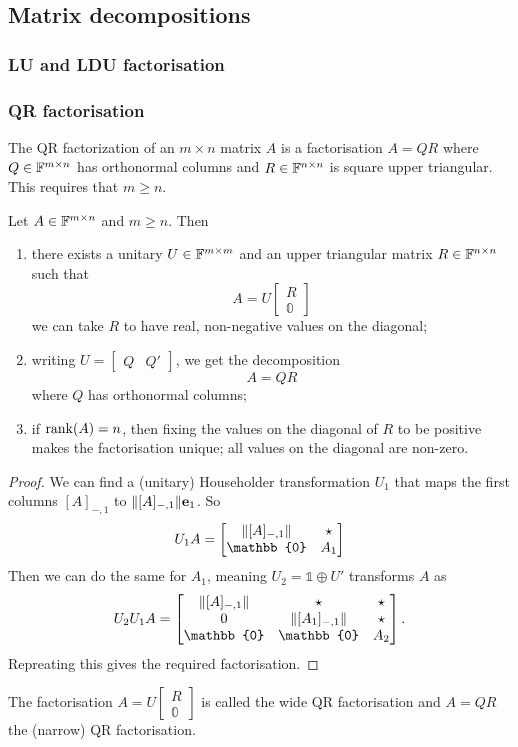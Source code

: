 \subsection{Matrix decompositions}
\subsubsection{LU and LDU factorisation}
\subsubsection{QR factorisation}
The QR factorization of an $m \times n$ matrix $A$ is a factorisation
$A=QR$
where $Q\in\mathbb{F}^{m\times n}$ has orthonormal columns and $R\in\mathbb{F}^{n\times n}$ is square upper triangular.
This requires that $m\geq n$.

\begin{proposition}[QR factorisation]
Let $A\in\mathbb{F}^{m\times n}$ and $m\geq n$. Then
\begin{enumerate}
\item there exists a unitary $U\in\mathbb{F}^{m\times m}$ and an upper triangular matrix $R\in\mathbb{F}^{n\times n}$ such that
\[ A = U \begin{bmatrix}
R \\ \mathbb{0}
\end{bmatrix} \]
we can take $R$ to have real, non-negative values on the diagonal;
\item writing $U = \begin{bmatrix}
Q & Q'
\end{bmatrix}$, we get the decomposition
\[ A = QR \]
where $Q$ has orthonormal columns;
\item if $\operatorname{rank}(A)= n$, then fixing the values on the diagonal of $R$ to be positive makes the factorisation unique; all values on the diagonal are non-zero.
\end{enumerate}
\end{proposition}
\begin{proof}
We can find a (unitary) Householder transformation $U_1$ that maps the first columns $[A]_{-,1}$ to $\lVert[A]_{-,1}\rVert\boldsymbol{\mathrm{e}}_1$. So
\[ U_1 A = \begin{bmatrix}
\norm{[A]_{-,1}} & \star \\ \mathbb{0} & A_1
\end{bmatrix} \]
Then we can do the same for $A_1$, meaning $U_2 = \mathbb{1}\oplus U'$ transforms $A$ as
\[ U_2U_1A = \begin{bmatrix}
\norm{[A]_{-,1}} & \star & \star \\
0 & \norm{[A_1]_{-,1}} & \star \\
\mathbb{0} & \mathbb{0} & A_2
\end{bmatrix}. \]
Repreating this gives the required factorisation.
\end{proof}
The factorisation $A = U \begin{bmatrix}
R \\ \mathbb{0}
\end{bmatrix}$ is called the wide QR factorisation and $A=QR$ the (narrow) QR factorisation.

